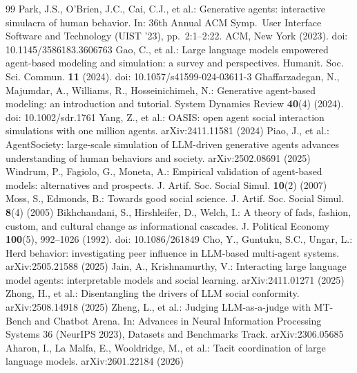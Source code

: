 \documentclass[runningheads]{llncs}
\begin{document}
\begin{thebibliography}{99}\scriptsize\linespread{0.92}\selectfont\setlength{\itemsep}{0pt}\setlength{\parsep}{0pt}\setlength{\parskip}{0pt}
Park, J.S., O'Brien, J.C., Cai, C.J., et al.: Generative agents: interactive simulacra of human behavior. In: 36th Annual ACM Symp.\ User Interface Software and Technology (UIST '23), pp.\ 2:1--2:22. ACM, New York (2023). doi: 10.1145/3586183.3606763
Gao, C., et al.: Large language models empowered agent-based modeling and simulation: a survey and perspectives. Humanit. Soc. Sci. Commun. \textbf{11} (2024). doi: 10.1057/s41599-024-03611-3
Ghaffarzadegan, N., Majumdar, A., Williams, R., Hosseinichimeh, N.: Generative agent-based modeling: an introduction and tutorial. System Dynamics Review \textbf{40}(4) (2024). doi: 10.1002/sdr.1761
Yang, Z., et al.: OASIS: open agent social interaction simulations with one million agents. arXiv:2411.11581 (2024)
Piao, J., et al.: AgentSociety: large-scale simulation of LLM-driven generative agents advances understanding of human behaviors and society. arXiv:2502.08691 (2025)
Windrum, P., Fagiolo, G., Moneta, A.: Empirical validation of agent-based models: alternatives and prospects. J. Artif. Soc. Social Simul. \textbf{10}(2) (2007)
Moss, S., Edmonds, B.: Towards good social science. J. Artif. Soc. Social Simul. \textbf{8}(4) (2005)
Bikhchandani, S., Hirshleifer, D., Welch, I.: A theory of fads, fashion, custom, and cultural change as informational cascades. J. Political Economy \textbf{100}(5), 992--1026 (1992). doi: 10.1086/261849
Cho, Y., Guntuku, S.C., Ungar, L.: Herd behavior: investigating peer influence in LLM-based multi-agent systems. arXiv:2505.21588 (2025)
Jain, A., Krishnamurthy, V.: Interacting large language model agents: interpretable models and social learning. arXiv:2411.01271 (2025)
Zhong, H., et al.: Disentangling the drivers of LLM social conformity. arXiv:2508.14918 (2025)
Zheng, L., et al.: Judging LLM-as-a-judge with MT-Bench and Chatbot Arena. In: Advances in Neural Information Processing Systems 36 (NeurIPS 2023), Datasets and Benchmarks Track. arXiv:2306.05685
Aharon, I., La Malfa, E., Wooldridge, M., et al.: Tacit coordination of large language models. arXiv:2601.22184 (2026)

\end{thebibliography}
\end{document}
